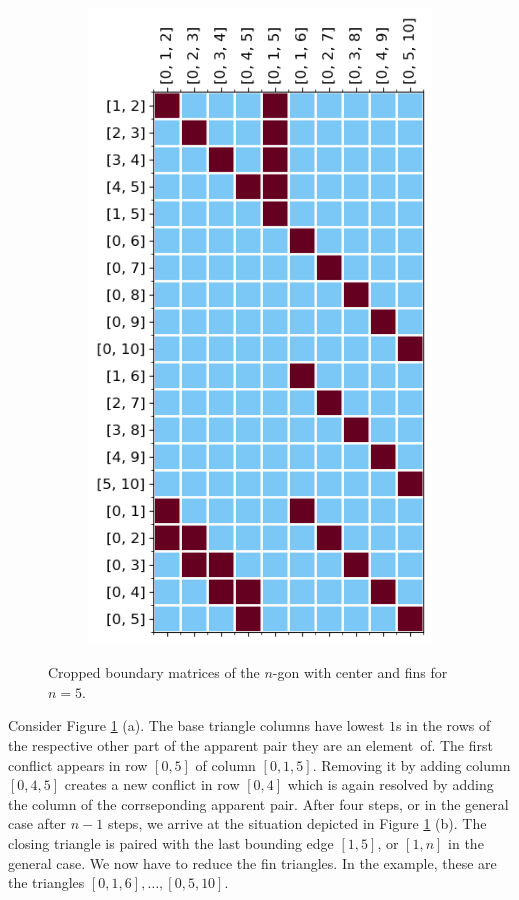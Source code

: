 \begin{figure}[H]
\begin{subfigure}[r]{0.49\textwidth}
\begin{center}
\includegraphics[scale=0.6]{ConnectingMorsePersistence/Figures/Reduction/finaltri.png}
\end{center}
\end{subfigure}
\caption{Cropped boundary matrices of the $n$-gon with center and fins for $n=5$.}
\label{fig:redfin}
\end{figure}

Consider Figure \ref{fig:redfin} (a). The base triangle columns have lowest $1$s in the rows of the respective other part of the apparent pair they are an element~of. The first conflict appears in row $[0,5]$ of column $[0,1,5]$. Removing it by adding column $[0,4,5]$ creates a new conflict in row $[0,4]$ which is again resolved by adding the column of the corrseponding apparent pair. After four steps, or in the general case after $n-1$ steps, we arrive at the situation depicted in Figure  \ref{fig:redfin} (b). The closing triangle is paired with the last bounding edge $[1,5]$, or $[1,n]$ in the general case. We now have to reduce the fin triangles. In the example, these are the triangles $[0,1,6],\dots, [0,5,10]$.

